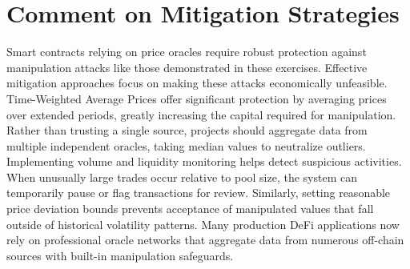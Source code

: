 \documentclass[12pt]{article}
\begin{document}
\section*{Comment on Mitigation Strategies}
Smart contracts relying on price oracles require robust protection against manipulation attacks like those demonstrated in these exercises. Effective mitigation approaches focus on making these attacks economically unfeasible.
Time-Weighted Average Prices offer significant protection by averaging prices over extended periods, greatly increasing the capital required for manipulation. Rather than trusting a single source, projects should aggregate data from multiple independent oracles, taking median values to neutralize outliers.
Implementing volume and liquidity monitoring helps detect suspicious activities. When unusually large trades occur relative to pool size, the system can temporarily pause or flag transactions for review. Similarly, setting reasonable price deviation bounds prevents acceptance of manipulated values that fall outside of historical volatility patterns.
Many production DeFi applications now rely on professional oracle networks that aggregate data from numerous off-chain sources with built-in manipulation safeguards.
\end{document}
